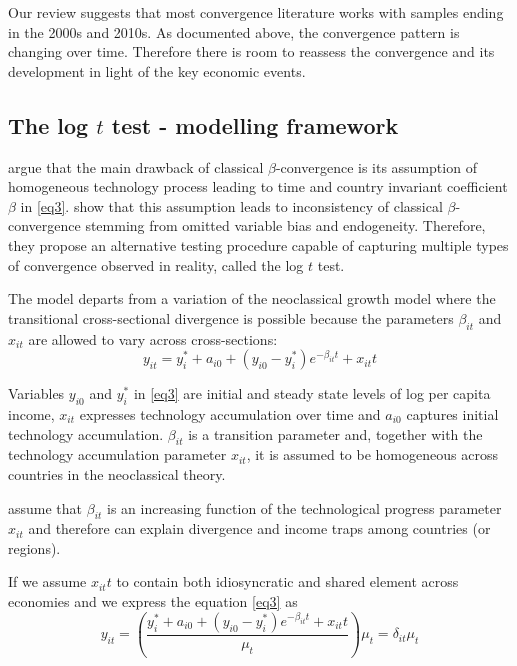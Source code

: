 \documentclass[11pt]{article}
\begin{document}
Our review suggests that most convergence literature works with samples ending in the 2000s and 2010s. As documented above, the convergence pattern is changing over time. Therefore there is room to reassess the convergence and its development in light of the key economic events.


\subsection{The log $t$ test - modelling framework}
\citet{phillips2007transition} argue that the main drawback of classical $\beta$-convergence is its assumption of homogeneous technology process leading to time and country invariant coefficient $\beta$ in \eqref{eq3}. \citet{phillips2007transition} show that this assumption leads to inconsistency of classical $\beta$-convergence stemming from omitted variable bias and endogeneity. Therefore, they propose an alternative testing procedure capable of capturing multiple types of convergence observed in reality, called the log $t$ test.


The model departs from a variation of the neoclassical growth model where the transitional cross-sectional divergence is possible because the parameters $\beta_{it}$ and $x_{it}$ are allowed to vary across cross-sections:
\begin{equation} \label{eq3}
 y_{it} = y_i^* + a_{i0} + (y_{i0} - y_i^*)e^{-\beta_{it}t} + x_{it}t 
\end{equation}

 Variables $y_{i0}$ and $y_{i}^{*}$ in \eqref{eq3} are initial and steady state levels of log per capita income, $x_{it}$ expresses technology accumulation over time and $a_{i0}$ captures initial technology accumulation. $\beta_{it}$ is a transition parameter and, together with the technology accumulation parameter $x_{it}$, it is assumed to be homogeneous across countries in the neoclassical theory.

\citeauthor{phillips2007transition} assume that $\beta_{it}$ is an increasing function of the technological progress parameter $x_{it}$ and therefore can explain divergence and income traps among countries (or regions).

If we assume $x_{it}t$ to contain both idiosyncratic and shared element across economies and we express the equation \eqref{eq3} as
\begin{equation} \label{eq4} y_{it} = (\frac{ y_i^* + a_{i0} + (y_{i0} - y_i^*)e^{-\beta_{it}t} + x_{it}t}{\mu_t})\mu_t = \delta_{it}\mu_t  \end{equation}
\end{document}
